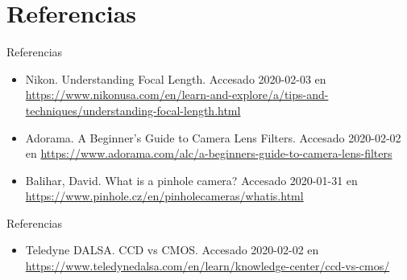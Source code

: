 \documentclass{if-beamer}
\begin{document}
\section*{Referencias}
\begin{frame}{Referencias}
\begin{itemize}
    \item Nikon. Understanding Focal Length. Accesado 2020-02-03 en \hyperlink{www.nikonusa.com}{https://www.nikonusa.com/en/learn-and-explore/a/tips-and-techniques/understanding-focal-length.html}
    \item Adorama. A Beginner’s Guide to Camera Lens Filters. Accesado 2020-02-02 en \hyperlink{https://www.adorama.com/alc/a-beginners-guide-to-camera-lens-filters}{https://www.adorama.com/alc/a-beginners-guide-to-camera-lens-filters}
    \item Balihar, David. What is a pinhole camera? Accesado 2020-01-31 en \hyperlink{https://www.pinhole.cz/en/pinholecameras/whatis.html}{https://www.pinhole.cz/en/pinholecameras/whatis.html}
\end{itemize}

\end{frame}

\begin{frame}{Referencias}
    \begin{itemize}
        \item Teledyne DALSA. CCD vs CMOS. Accesado 2020-02-02 en \hyperlink{https://www.teledynedalsa.com/en/learn/knowledge-center/ccd-vs-cmos/}{https://www.teledynedalsa.com/en/learn/knowledge-center/ccd-vs-cmos/}
    \end{itemize}
\end{frame}
\end{document}
